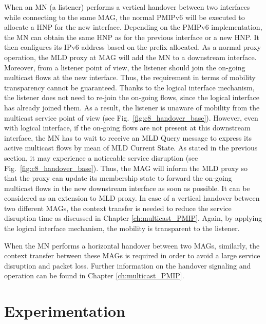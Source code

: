 When an MN (a listener) performs a vertical handover between two interfaces while connecting to the same MAG, the normal PMIPv6 will be executed to allocate a HNP for the new interface. Depending on the PMIPv6 implementation, the MN can obtain the same HNP as for the previous interface or a new HNP. It then configures its IPv6 address based on the prefix allocated. As a normal proxy operation, the MLD proxy at MAG will add the MN to a downstream interface. Moreover, from a listener point of view, the listener should join the on-going multicast flows at the new interface. Thus, the requirement in terms of mobility transparency cannot be guaranteed. Thanks to the logical interface mechanism, the listener does not need to re-join the on-going flows, since the logical interface has already joined them. As a result, the listener is unaware of mobility from the multicast service point of view (see Fig.~\ref{fig:c8_handover_base}). However, even with logical interface, if the on-going flows are not present at this downstream interface, the MN has to wait to receive an MLD Query message to express its active multicast flows by mean of MLD Current State. As stated in the previous section, it may experience a noticeable service disruption (see Fig.~\ref{fig:c8_handover_base}). Thus, the MAG will inform the MLD proxy so that the proxy can update its membership state to forward the on-going multicast flows in the new downstream interface as soon as possible. It can be considered as an extension to MLD proxy. In case of a vertical handover between two different MAGs, the context transfer is needed to reduce the service disruption time as discussed in Chapter \ref{ch:multicast_PMIP}. Again, by applying the logical interface mechanism, the mobility is transparent to the listener.  

When the MN performs a horizontal handover between two MAGs, similarly, the context transfer between these MAGs is required in order to avoid a large service disruption and packet loss. Further information on the handover signaling and operation can be found in Chapter \ref{ch:multicast_PMIP}.
 
\section{Experimentation} \label{ch8:experimentation}
